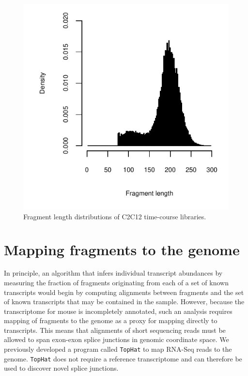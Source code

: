 \documentclass[12pt]{amsart}
\theoremstyle{definition}
\begin{document}
\begin{figure}[h] 
    \includegraphics{pdfs/library_frags.pdf}
    \caption[Fragment length distributions of C2C12 time-course libraries]{Fragment length distributions of C2C12 time-course libraries. \label{fragment_lengths}}
\end{figure}

\section{Mapping fragments to the genome}

In principle, an algorithm that infers individual transcript abundances by
measuring the fraction of fragments originating from each of a set of known
transcripts would begin by computing alignments between fragments and the set
of known transcripts that may be contained in the sample. However, because the
transcriptome for mouse is incompletely annotated, such an analysis requires
mapping of fragments to the genome as a proxy for mapping directly to
transcripts. This means that alignments of short sequencing reads must be
allowed to span exon-exon splice junctions in genomic coordinate space. We
previously developed a program called {\tt TopHat} to map RNA-Seq reads to the
genome. {\tt TopHat} does not require a reference transcriptome and can
therefore be used to discover novel splice junctions. \cite{Trapnell2009}
\end{document}
